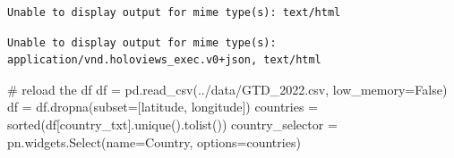 \documentclass[
  letterpaper,
  DIV=11,
  numbers=noendperiod]{scrreprt}
\newenvironment{Shaded}{\begin{snugshade}}{\end{snugshade}}
\newcommand{\BuiltInTok}[1]{\textcolor[rgb]{0.00,0.23,0.31}{#1}}
\newcommand{\CommentTok}[1]{\textcolor[rgb]{0.37,0.37,0.37}{#1}}
\newcommand{\NormalTok}[1]{\textcolor[rgb]{0.00,0.23,0.31}{#1}}
\newcommand{\OperatorTok}[1]{\textcolor[rgb]{0.37,0.37,0.37}{#1}}
\newcommand{\StringTok}[1]{\textcolor[rgb]{0.13,0.47,0.30}{#1}}
\newcommand{\VariableTok}[1]{\textcolor[rgb]{0.07,0.07,0.07}{#1}}
\begin{document}
\begin{verbatim}
Unable to display output for mime type(s): text/html
\end{verbatim}

\begin{verbatim}
Unable to display output for mime type(s): application/vnd.holoviews_exec.v0+json, text/html
\end{verbatim}

\begin{Shaded}
\begin{Highlighting}[]
\CommentTok{\# reload the df}
\NormalTok{df }\OperatorTok{=}\NormalTok{ pd.read\_csv(}\StringTok{\textquotesingle{}../data/GTD\_2022.csv\textquotesingle{}}\NormalTok{, low\_memory}\OperatorTok{=}\VariableTok{False}\NormalTok{)}
\NormalTok{df }\OperatorTok{=}\NormalTok{ df.dropna(subset}\OperatorTok{=}\NormalTok{[}\StringTok{\textquotesingle{}latitude\textquotesingle{}}\NormalTok{, }\StringTok{\textquotesingle{}longitude\textquotesingle{}}\NormalTok{])}
\NormalTok{countries }\OperatorTok{=} \BuiltInTok{sorted}\NormalTok{(df[}\StringTok{\textquotesingle{}country\_txt\textquotesingle{}}\NormalTok{].unique().tolist())}
\NormalTok{country\_selector }\OperatorTok{=}\NormalTok{ pn.widgets.Select(name}\OperatorTok{=}\StringTok{\textquotesingle{}Country\textquotesingle{}}\NormalTok{, options}\OperatorTok{=}\NormalTok{countries)}
\end{Highlighting}
\end{Shaded}
\end{document}
